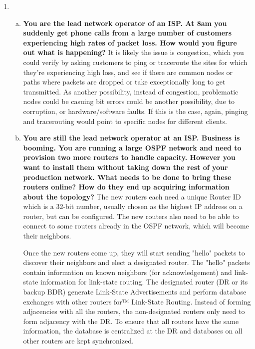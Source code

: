 \documentclass[11pt]{article}
\begin{document}
\begin{enumerate}[1.]

\item %
  \begin{enumerate}[(a)]  
  \item 
  \textbf{
    You are the lead network operator of an ISP. At 8am you suddenly get phone calls from a large number of customers experiencing high rates of packet loss. 
    How would you figure out what is happening? 
  }   
  It is likely the issue is congestion, which you could verify by asking customers to ping or traceroute the sites for which they're experiencing high loss, and see if there are common nodes or paths where packets are dropped or take exceptionally long to get transmitted. As another possibility, instead of congestion, problematic nodes could be casuing bit errors could be another possibility, due to corruption, or hardware/software faults. If this is the case, again, pinging and tracerouting would point to specific nodes for different clients.

  \item 
  \textbf{
    You are still the lead network operator at an ISP. Business is booming. You are running a large OSPF network and need to provision two more routers to handle capacity. However you want to install them without taking down the rest of your production network. What needs to be done to bring these routers online? How do they end up acquiring information about the topology? 
  } 
  The new routers each need a unique Router ID which is a 32-bit number, usually chosen as the highest IP address on a router, but can be configured. The new routers also need to be able to connect to some routers already in the OSPF network, which will become their neighbors. 

  Once the new routers come up, they will start sending "hello" packets to discover their neighbors and elect a designated router. The "hello" packets contain information on known neighbors (for acknowledgement) and link-state information for link-state routing. The designated router (DR or its backup BDR) generate Link-State Advertisements and perform database exchanges with other routers for™ Link-State Routing. Instead of forming adjacencies with all the routers, the non-designated routers only need to form adjacency with the DR. To ensure that all routers have the same information, the database is centralized at the DR and databases on all other routers are kept synchronized.
  \end{enumerate}


\end{enumerate}
\end{document}
